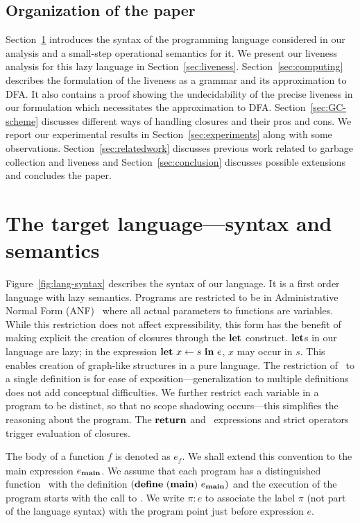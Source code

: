 \documentclass[9pt]{sigplanconf}
\begin{document}
\subsection{Organization of the paper}

Section~\ref{sec:defs}  introduces  the   syntax  of  the  programming
language  considered  in our  analysis  and  a small-step  operational
semantics  for it.   We present  our liveness  analysis for  this lazy
language  in Section~\ref{sec:liveness}.   Section~\ref{sec:computing}
describes  the  formulation of  the  liveness  as  a grammar  and  its
approximation  to   DFA.  It  also   contains  a  proof   showing  the
undecidability  of  the  precise  liveness in  our  formulation  which
necessitates  the approximation  to DFA.   Section~\ref{sec:GC-scheme}
discusses different ways of handling closures and their pros and cons.
We  report our  experimental results  in Section~\ref{sec:experiments}
along with some observations.  Section~\ref{sec:relatedwork} discusses
previous  work   related  to  garbage  collection   and  liveness  and
Section~\ref{sec:conclusion}   discusses   possible   extensions   and
concludes the paper.
\section{The target language---syntax and semantics}
\label{sec:defs}
Figure~\ref{fig:lang-syntax} describes the syntax  of our language. It
is a first order language with lazy semantics. Programs are restricted
to        be        in        Administrative        Normal        Form
(ANF)~\cite{chakravarty03perspective} where  all actual  parameters to
functions  are  variables.  While  this  restriction  does not  affect
expressibility,  this form  has  the benefit  of  making explicit  the
creation of  closures through  the $\mbox{$\mathbf{ let}$}$  construct.  $\mbox{$\mathbf{ let}$}$s  in our
language  are lazy;  in the  expression $\mbox{$\mathbf{ let}$}\,\,  x \leftarrow  s\,\,
\mbox{$\mathbf{ in}$}\,\, e$, $x$ may occur in  $s$. This enables creation of graph-like
structures in  a pure language. The  restriction of \LET\ to  a single
definition  is for  ease  of  exposition---generalization to  multiple
definitions does not add conceptual difficulties.  We further restrict
each variable in a program to  be distinct, so that no scope shadowing
occurs---this  simplifies  the  reasoning   about  the  program.   The
$\mbox{$\mathbf{ return}$}$  and   \SIF\  expressions  and  strict   operators  trigger
evaluation of closures.

The body  of a function ${\mathit  f}$ is denoted  as $e_{\mathit f}$.
We   shall   extend   this   convention   to   the   main   expression
$e_{\mathbf{main}}$. We assume that each program has a distinguished function
\mainpgm\      with      the      definition     $(\mbox{$\mathbf{define}$}\      ({\tt
  \mathbf{main}})\  e_{\mathbf{main}})$ and  the execution  of the  program starts
with the call to \mainpgm.  We write $\pi\!:\!e$ to associate the label
$\pi$ (not  part of the language  syntax) with the  program point just
before expression $e$.
\end{document}
